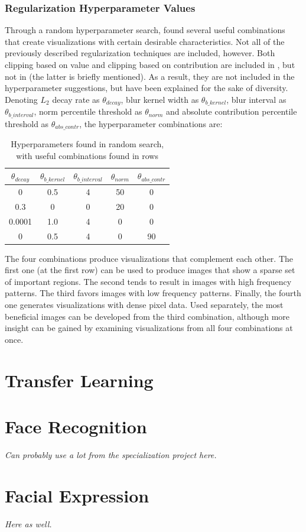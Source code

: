 \subsubsection{Regularization Hyperparameter Values}

Through a random hyperparameter search, \cite{deepvis} found several useful combinations that create visualizations with certain desirable characteristics. Not all of the previously described regularization techniques are included, however. Both clipping based on value and clipping based on contribution are included in \cite{deepvis_web}, but not in \cite{deepvis} (the latter is briefly mentioned). As a result, they are not included in the hyperparameter suggestions, but have been explained for the sake of diversity. \\

\noindent Denoting $L_2$ decay rate as $\theta_{decay}$, blur kernel width as $\theta_{b\_kernel}$, blur interval as $\theta_{b\_interval}$, norm percentile threshold as $\theta_{norm}$ and absolute contribution percentile threshold as $\theta_{abs\_contr}$, the hyperparameter combinations are:

\begin{table}[!h]
\begin{center}
\begin{tabular}{|c|c|c|c|c|}
\hline
\textbf{$\theta_{decay}$} & \textbf{$\theta_{b\_kernel}$} & \textbf{$\theta_{b\_interval}$} & \textbf{$\theta_{norm}$} & \textbf{$\theta_{abs\_contr}$} \\ \hline
0 & 0.5 & 4 & 50 & 0 \\ \hline
0.3 & 0 & 0 & 20 & 0 \\ \hline
0.0001 & 1.0 & 4 & 0 & 0 \\ \hline
0 & 0.5 & 4 & 0 & 90 \\ \hline
\end{tabular}
\end{center}
\caption{Hyperparameters found in random search, with useful combinations found in rows}
\label{tab:reg_hyperparams}
\end{table}

\noindent The four combinations produce visualizations that complement each other. The first one (at the first row) can be used to produce images that show a sparse set of important regions. The second tends to result in images with high frequency patterns. The third favors images with low frequency patterns. Finally, the fourth one generates visualizations with dense pixel data. Used separately, the most beneficial images can be developed from the third combination, although more insight can be gained by examining visualizations from all four combinations at once.


\section{Transfer Learning}

\section{Face Recognition}

\textit{Can probably use a lot from the specialization project here.}

\section{Facial Expression}

\textit{Here as well.}

\cleardoublepage